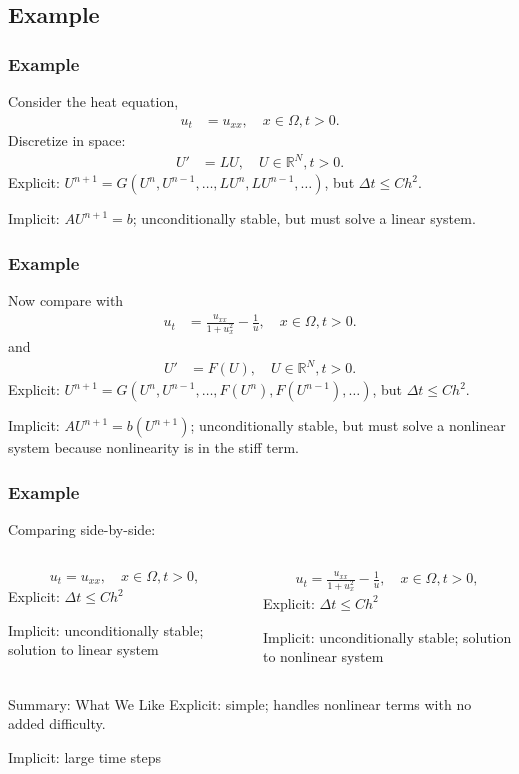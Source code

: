 \documentclass[hyperref={pdfpagelabels=false}]{beamer}
\begin{document}
\subsection{Example}
\begin{frame}
\frametitle{Example}	
Consider the heat equation, 
\begin{align*}
u_t &= u_{xx}, \quad x \in \Omega, t > 0.
\end{align*}
Discretize in space:
\begin{align*}
U' &= LU, \quad U \in \mathbb{R}^N, t > 0.
\end{align*}
Explicit: $U^{n+1} = G(U^n,U^{n-1},\dots, LU^n, LU^{n-1},\dots)$, but $\Delta t \leq Ch^2$. 

Implicit: $AU^{n+1} = b$; unconditionally stable, but must solve a linear system. 
\end{frame}
\begin{frame}
\frametitle{Example}	
Now compare with 
\begin{align*}
u_t &= \frac{u_{xx}}{1 + u_x^2} - \frac{1}{u}, \quad x \in \Omega, t > 0.
\end{align*}
and 
\begin{align*} 
U' &= F(U), \quad U \in \mathbb{R}^N, t > 0.
\end{align*}
Explicit: $U^{n+1} = G(U^n,U^{n-1},\dots, F(U^n), F(U^{n-1}),\dots)$, but $\Delta t \leq Ch^2$. 

Implicit: $AU^{n+1} = b(U^{n+1})$; unconditionally stable, but must solve a nonlinear system because nonlinearity is in the stiff term. 
\end{frame}
\begin{frame}
	\frametitle{Example}
	Comparing side-by-side:
	\begin{columns}
\begin{column}{0.48\textwidth}
	\begin{align*} 
		u_t = u_{xx}, \quad x\in \Omega, t > 0,
	\end{align*}
Explicit: $\Delta t \leq Ch^2$

Implicit: unconditionally stable; solution to linear system
\end{column}
\begin{column}{0.48\textwidth}
\begin{align*} 
	u_t = \frac{u_{xx}}{1 + u_x^2} - \frac{1}{u}, \quad x\in \Omega, t > 0,
\end{align*}
Explicit: $\Delta t \leq Ch^2$

Implicit: unconditionally stable; solution to nonlinear system
\end{column}
	\end{columns}
\begin{alertblock}{Summary: What We Like}
	Explicit: simple; handles nonlinear terms with no added difficulty.
	
	Implicit: large time steps
\end{alertblock}	
\end{frame}
\end{document}
